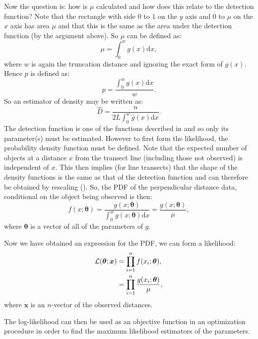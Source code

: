 Now the question is: how is $\mu$ calculated and how does this relate to the detection function? Note that the rectangle with side $0$ to $1$ on the $y$ axis and $0$ to $\mu$ on the $x$ axis has area $\mu$ and that this is the same as the area under the detection function (by the argument above). So $\mu$ can be defined as:
\begin{equation}
\mu = \int_0^w g(x) \text{d}x,
\label{ds-lt-mu-def}
\end{equation}
where $w$ is again the truncation distance and ignoring the exact form of $g(x)$. Hence $p$ is defined as:
\begin{equation*}
p = \frac{\int_0^w g(x) \text{d}x}{w}.
\end{equation*}
So an estimator of density may be written as:
\begin{equation*}
\hat{D}=\frac{n}{2L \int_0^w \hat{g}(x) \text{d}x}.
\end{equation*}
The detection function is one of the functions described in  and so only its parameter(s) must be estimated. However to first form the likelihood, the probability density function must be defined. Note that the expected number of objects at a distance $x$ from the transect line (including those not observed) is independent of $x$. This then implies (for line transects) that the shape of the density functions is the same as that of the detection function and can therefore be obtained by rescaling (\cite[p. 38]{IDS}). So, the PDF of the perpendicular distance data, conditional on the object being observed is then:
\begin{equation*}
f(x;\bm{\theta}) = \frac{g(x;\bm{\theta})}{\int_0^w g(x;\bm{\theta}) \text{d}x} = \frac{g(x;\bm{\theta})}{\mu},
\end{equation*}
where $\bm{\theta}$ is a vector of all of the parameters of $g$.

Now we have obtained an expression for the PDF, we can form a likelihood:
\begin{align}
\mathcal{L}(\bm{\theta}; \bm{x}) &= \prod_{i=1}^n f(x_i;\bm{\theta}),\notag \\
&= \prod_{i=1}^n \frac{g(x_i;\bm{\theta})}{\mu},
\label{ds-lt-likelihood}
\end{align}
where $\bm{x}$ is an $n$-vector of the observed distances.

The log-likelihood can then be used as an objective function in an optimization procedure in order to find the maximum likelihood estimators of the parameters.

